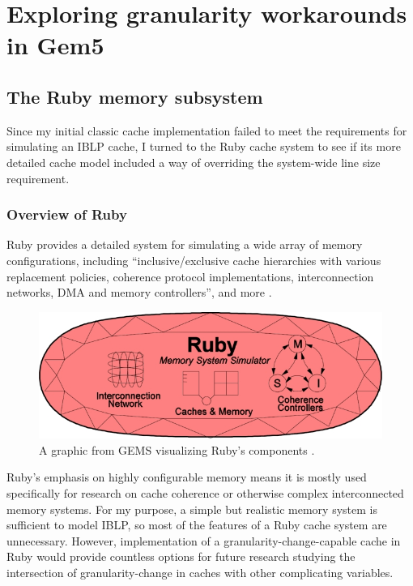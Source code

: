 \documentclass[12pt,twoside]{reedthesis}
\begin{document}
\chapter{Exploring granularity workarounds in Gem5}

\section{The Ruby memory subsystem}

	Since my initial classic cache implementation failed to meet the requirements for simulating an IBLP cache, I turned to the Ruby cache system to see if its more detailed cache model included a way of overriding the system-wide line size requirement.

	\subsection*{Overview of Ruby}

	Ruby provides a detailed system for simulating a wide array of memory configurations, including ``inclusive/exclusive cache hierarchies with various replacement policies, coherence protocol implementations, interconnection networks, DMA and memory controllers'', and more \cite{gem5-ruby}.

	\begin{figure}[h]
		\centering
		\includegraphics[width=4.5in]{figures/ruby.jpg}
		\caption{A graphic from GEMS visualizing Ruby's components \cite{gem5-ruby}.}
	\end{figure}

	Ruby's emphasis on highly configurable memory means it is mostly used specifically for research on cache coherence or otherwise complex interconnected memory systems. For my purpose, a simple but realistic memory system is sufficient to model IBLP, so most of the features of a Ruby cache system are unnecessary. However, implementation of a granularity-change-capable cache in Ruby would provide countless options for future research studying the intersection of granularity-change in caches with other complicating variables.
\end{document}
